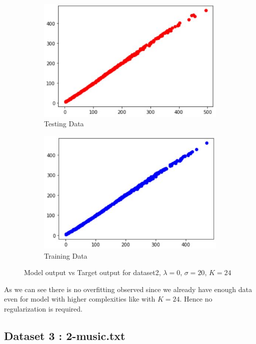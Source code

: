 \documentclass[11pt]{article}
\begin{document}
\begin{figure}[h]
\centering
	\begin{subfigure}[b]{0.45\textwidth}
	\centering
	\includegraphics[scale=0.7]{dataset2_k8_lambda0_test.jpg}
	\caption{Testing Data}
	\label{fig:fig3.1.1.1}
	\end{subfigure}
	\begin{subfigure}[b]{0.45\textwidth}
	\centering
	\includegraphics[scale=0.7]{dataset2_k8_lambda0_train.jpg}
	\caption{Training Data}
	\label{fig:fig3.1.1.2}
	\end{subfigure}
\caption{Model output vs Target output for dataset2, $\lambda =0$, $\sigma =20$, $K = 24$}
\label{fig:fig3.1.1}
\end{figure}

As we can see there is no overfitting observed since we already have enough data even for model with higher complexities like with $K =24$. Hence no regularization is required.

\newpage
\subsection{Dataset 3 : 2-music.txt}
\end{document}
